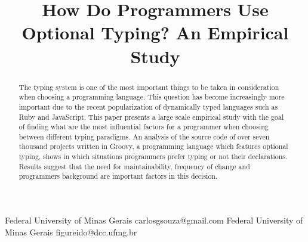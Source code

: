 \documentclass[preprint]{sigplanconf}
\begin{document}
\setlength{\pdfpageheight}{\paperheight}
\setlength{\pdfpagewidth}{\paperwidth}






\title{How Do Programmers Use Optional Typing? An Empirical Study}

           {Federal University of Minas Gerais}
           {carlosgsouza@gmail.com}
           {Federal University of Minas Gerais}
           {figureido@dcc.ufmg.br}

\maketitle

\begin{abstract}
The typing system is one of the most important things to be taken in consideration when choosing a programming language. 
This question has become increasingly more important due to the recent popularization of dynamically typed languages such as Ruby and JavaScript. 
This paper presents a large scale empirical study with the goal of finding what are the most influential factors for a programmer when choosing between different typing paradigms. 
An analysis of the source code of over seven thousand projects written in Groovy, a programming language which features optional typing, shows in which situations programmers prefer typing or not their declarations. 
Results suggest that the need for maintainability, frequency of change and programmers background are important factors in this decision.
\end{abstract}
\end{document}
